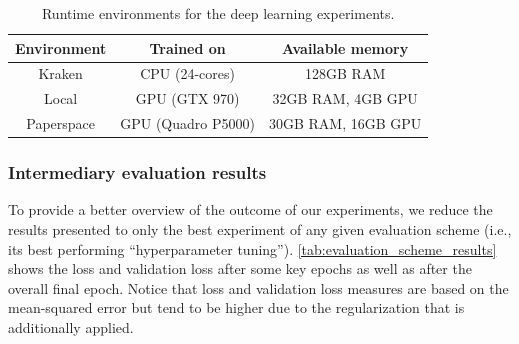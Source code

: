 \begin{table}[h]
  \centering
  \begin{tabular}{ ccc }
    \toprule
    \textbf{Environment} & \textbf{Trained on} & \textbf{Available memory} \\
    \midrule
    Kraken & CPU (24-cores) & 128GB RAM \\
    Local & GPU (GTX 970) & 32GB RAM, 4GB GPU \\
    Paperspace & GPU (Quadro P5000) & 30GB RAM, 16GB GPU \\
    \bottomrule
  \end{tabular}
  \caption{Runtime environments for the deep learning experiments.}
\label{tab:experimental_environments}
\end{table}

\clearpage
\subsubsection{Intermediary evaluation results}
To provide a better overview of the outcome of our experiments, we reduce the results presented to only the best experiment of any given evaluation scheme (i.e., its best performing ``hyperparameter tuning''). \cref{tab:evaluation_scheme_results} shows the loss and validation loss after some key epochs as well as after the overall final epoch. Notice that loss and validation loss measures are based on the mean-squared error but tend to be higher due to the regularization that is additionally applied.

